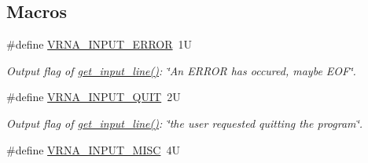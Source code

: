 \subsection*{Macros}
\begin{DoxyCompactItemize}
\item 
\#define \hyperlink{group__utils_gad403c9ea58f1836689404c2931419c8c}{V\+R\+N\+A\+\_\+\+I\+N\+P\+U\+T\+\_\+\+E\+R\+R\+OR}~1U\hypertarget{group__utils_gad403c9ea58f1836689404c2931419c8c}{}\label{group__utils_gad403c9ea58f1836689404c2931419c8c}

\begin{DoxyCompactList}\small\item\em Output flag of \hyperlink{group__utils_ga8ef1835eb83f542396f59f0b205965e5}{get\+\_\+input\+\_\+line()}\+: {\itshape \char`\"{}\+An E\+R\+R\+O\+R has occured, maybe E\+O\+F\char`\"{}}. \end{DoxyCompactList}\item 
\#define \hyperlink{group__utils_ga72f3c6ca5c83d2b9baed2922d19c403d}{V\+R\+N\+A\+\_\+\+I\+N\+P\+U\+T\+\_\+\+Q\+U\+IT}~2U\hypertarget{group__utils_ga72f3c6ca5c83d2b9baed2922d19c403d}{}\label{group__utils_ga72f3c6ca5c83d2b9baed2922d19c403d}

\begin{DoxyCompactList}\small\item\em Output flag of \hyperlink{group__utils_ga8ef1835eb83f542396f59f0b205965e5}{get\+\_\+input\+\_\+line()}\+: {\itshape \char`\"{}the user requested quitting the program\char`\"{}}. \end{DoxyCompactList}\item 
\#define \hyperlink{group__utils_ga8e3241b321c9c1a78a69e59e2e019a71}{V\+R\+N\+A\+\_\+\+I\+N\+P\+U\+T\+\_\+\+M\+I\+SC}~4U\hypertarget{group__utils_ga8e3241b321c9c1a78a69e59e2e019a71}{}\label{group__utils_ga8e3241b321c9c1a78a69e59e2e019a71}


\end{DoxyCompactItemize}
